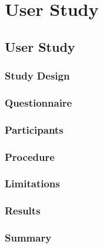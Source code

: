 \chapter{User Study}
\label{ch:study}
\section{User Study}

\subsection{Study Design}
\subsection{Questionnaire}
\subsection{Participants}
\subsection{Procedure}
\subsection{Limitations}
\subsection{Results}
\subsection{Summary}


